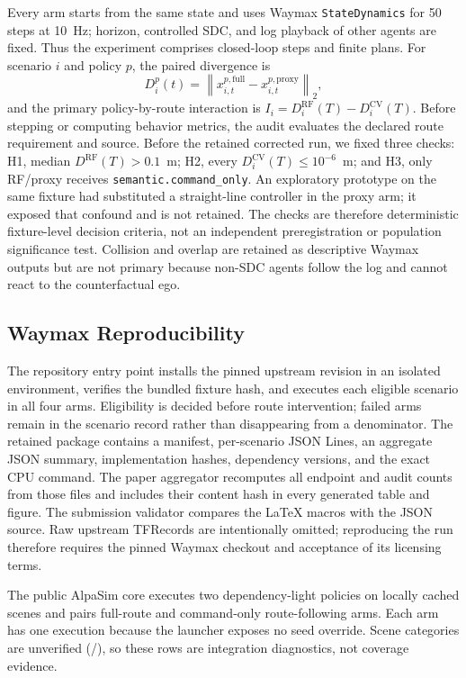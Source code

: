 \documentclass[a4paper,10pt,conference]{ieeeconf}
\begin{document}
Every arm starts from the same state and uses Waymax \texttt{StateDynamics} for 50
steps at 10~Hz; horizon, controlled SDC, and log playback of other agents are fixed.
Thus the experiment comprises \CVMWaymaxClosedLoopSteps{} closed-loop steps and
\CVMWaymaxFinitePlans{} finite plans. For scenario $i$ and policy $p$, the paired
divergence is
\begin{equation}
D_i^p(t)=\left\lVert x_{i,t}^{p,\mathrm{full}}-
x_{i,t}^{p,\mathrm{proxy}}\right\rVert_2,
\end{equation}
and the primary policy-by-route interaction is
$I_i=D_i^{\mathrm{RF}}(T)-D_i^{\mathrm{CV}}(T)$. Before stepping or computing behavior
metrics, the audit evaluates the declared route requirement and source. Before the
retained corrected run, we fixed three checks: H1, median
$D^{\mathrm{RF}}(T)>0.1$~m; H2, every
$D_i^{\mathrm{CV}}(T)\leq10^{-6}$~m; and H3, only RF/proxy receives
\texttt{semantic.command\_only}. An exploratory prototype on the same fixture had
substituted a straight-line controller in the proxy arm; it exposed that confound and is
not retained. The checks are therefore deterministic fixture-level decision criteria,
not an independent preregistration or population significance test. Collision and
overlap are retained as descriptive Waymax outputs but are not primary because non-SDC
agents follow the log and cannot react to the counterfactual ego.

\subsection{Waymax Reproducibility}

The repository entry point installs the pinned upstream revision in an isolated
environment, verifies the bundled fixture hash, and executes each eligible scenario in
all four arms. Eligibility is decided before route intervention; failed arms remain in
the scenario record rather than disappearing from a denominator. The retained package
contains a manifest, per-scenario JSON Lines, an aggregate JSON summary, implementation
hashes, dependency versions, and the exact CPU command. The paper aggregator recomputes
all endpoint and audit counts from those files and includes their content hash in every
generated table and figure. The submission validator compares the LaTeX macros with the
JSON source. Raw upstream TFRecords are intentionally omitted; reproducing the run
therefore requires the pinned Waymax checkout and acceptance of its licensing terms.

The public AlpaSim core executes two dependency-light policies on
\CVMClosedLoopSceneCount{} locally cached scenes and pairs full-route and command-only
route-following arms. Each arm has one execution because the launcher exposes no seed
override. Scene categories are unverified
(\CVMVerifiedRequiredScenarioCategoryCount{}/\CVMRequiredScenarioCategoryCount{}), so
these rows are integration diagnostics, not coverage evidence.
\end{document}
